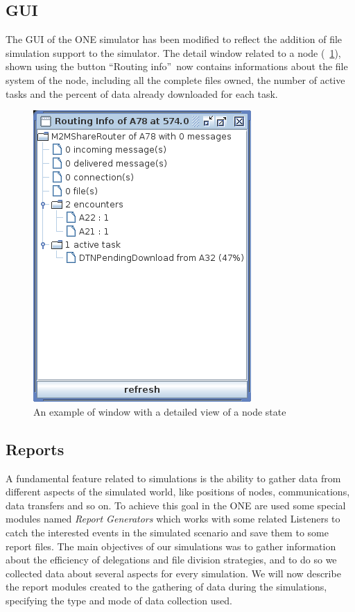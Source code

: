 \subsection{GUI}
The GUI of the ONE simulator has been modified to reflect the addition of file simulation support to the simulator. The detail window related to a node (\figurename~\ref{implRouting-Info}), shown using the button \textquotedblleft Routing info\textquotedblright \ now contains informations about the file system of the node, including all the complete files owned, the number of active tasks and the percent of data already downloaded for each task. 
\begin{figure}[htpb]
  \begin{center}
    \includegraphics[scale=0.6]{6-implementazione/img/Routing-Info.png}
    \caption{An example of window with a detailed view of a node state}    
    \label{implRouting-Info}
  \end{center}
\end{figure}

\subsection{Reports}
\label{descrReports}
A fundamental feature related to simulations is the ability to gather data from different aspects of the simulated world, like positions of nodes, communications, data transfers and so on. To achieve this goal in the ONE are used some special modules named \textit{Report Generators} which works with some related Listeners to catch the interested events in the simulated scenario and save them to some report files.
The main objectives of our simulations was to gather information about the efficiency of delegations and file division strategies, and to do so we collected data about several aspects for every simulation. We will now describe the report modules created to the gathering of data during the simulations, specifying the type and mode of data collection used.

